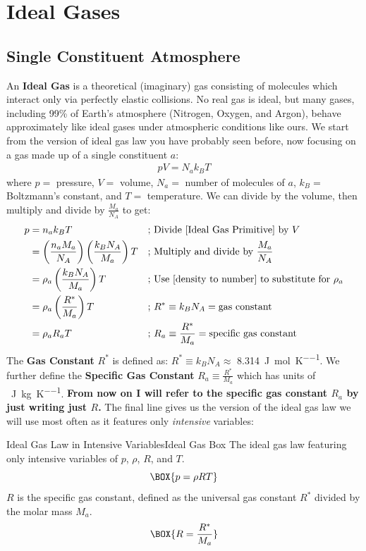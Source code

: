 \section{Ideal Gases}

\subsection{Single Constituent Atmosphere}

An \textbf{Ideal Gas} is a theoretical (imaginary) gas consisting of molecules which interact only via perfectly elastic collisions. No real gas is ideal, but many gases, including 99\% of Earth's atmosphere (Nitrogen, Oxygen, and Argon), behave approximately like ideal gases under atmospheric conditions like ours. We start from the version of ideal gas law you have probably seen before, now focusing on a gas made up of a single constituent $a$:
\begin{align}\label{Ideal Gas Primitive}
    pV=N_ak_BT
\end{align}
where $p=$ pressure, $V=$ volume, $N_a=$ number of molecules of $a$, $k_B=$ Boltzmann's constant, and $T=$ temperature. We can divide by the volume, then multiply and divide by $\frac{M_a}{N_A}$ to get: 
\begin{align*}
    p&=n_ak_BT & \text{; }&\text{Divide \ref{Ideal Gas Primitive} by }V\\
    &=\left(\frac{n_aM_a}{N_A}\right)\left(\frac{k_BN_A}{M_a}\right)T&\text{; }&\text{Multiply and divide by }\frac{M_a}{N_A}\\
    &=\rho_a\left(\frac{k_BN_A}{M_a}\right)T & \text{; }& \text{Use \ref{density to number} to substitute for }\rho_a\\
    &=\rho_a\left(\frac{R^*}{M_a}\right)T
    &\text{; }&R^*\equiv k_BN_A=\text{gas constant}\\
    &=\rho_aR_aT
    &\text{; }&R_a\equiv\frac{R^*}{M_a}=\text{specific gas constant}
\end{align*}
The \textbf{Gas Constant} $R^*$ is defined as: $R^*\equiv k_BN_A\approx$ \qty{8.314}{\joule\per\mole\per\kelvin}. We further define the \textbf{Specific Gas Constant} $R_a\equiv \frac{R^*}{M_a}$ which has units of \qty{}{\joule\per\kilogram\per\kelvin}. \textbf{From now on I will refer to the specific gas constant $R_a$ by just writing just $R$.} The final line gives us the version of the ideal gas law we will use most often as it features only \textit{intensive} variables:
\begin{fact}{Ideal Gas Law in Intensive Variables}{Ideal Gas Box}\label{Ideal Gas Box}
The ideal gas law featuring only intensive variables of $p$, $\rho$, $R$, and $T$.
    \begin{equation}\label{Ideal Gas}
    \BOX{
        p=\rho RT
    }
    \end{equation}
 $R$ is the specific gas constant, defined as the universal gas constant $R^*$ divided by the molar mass $M_a$.
    \begin{equation}\label{Specific Gas Constant One}
    \BOX{
        R=\frac{R^*}{M_a}
    }
    \end{equation}
\end{fact}

